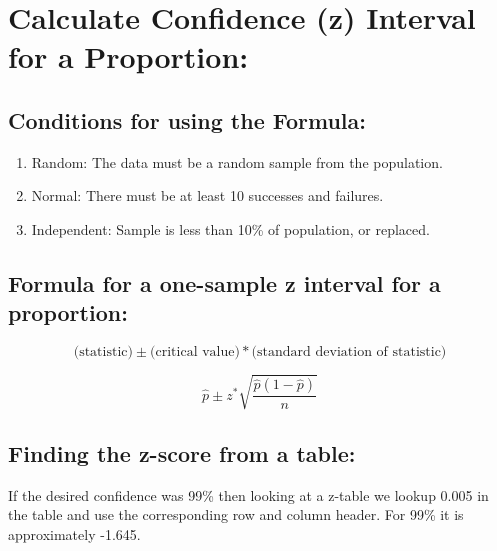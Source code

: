 \documentclass[12pt]{article}
\begin{document}
\section*{Calculate Confidence (z) Interval for a Proportion:}

\subsection*{Conditions for using the Formula:}
\begin{enumerate}
  \item Random: The data must be a random sample from the population.
  \item Normal: There must be at least 10 successes and failures.
  \item Independent: Sample is less than 10\% of population, or replaced.
\end{enumerate}
\subsection*{Formula for a one-sample z interval for a proportion:}
  \begin{equation*}
    \text{(statistic)}\pm\text{(critical value)} *
    \text{(standard deviation of statistic)}
  \end{equation*}

  \begin{equation}
    \hat{p} \pm z^{*}\sqrt{\frac{\hat{p}(1-\hat{p})}{n}}
  \end{equation}
\subsection*{Finding the z-score from a table:}
If the desired confidence was 99\% then looking at a z-table we lookup 0.005 in the table and use the corresponding row and column header. For 99\% it is approximately -1.645.

\end{document}
